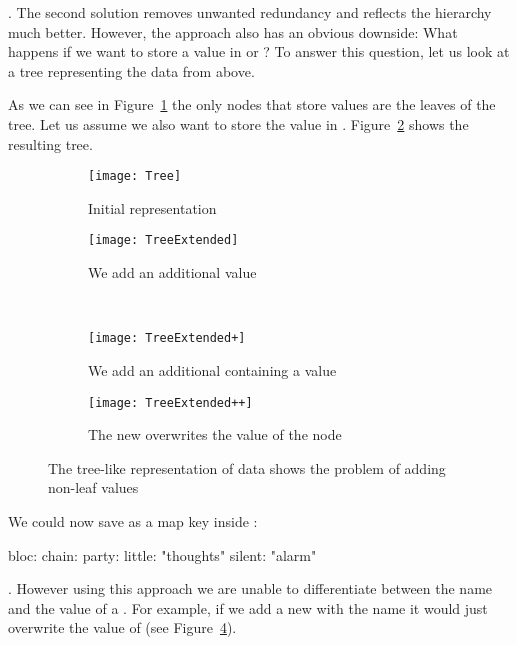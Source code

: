 . The second solution removes unwanted redundancy and reflects the hierarchy much better. However, the approach also has an obvious downside: What happens if we want to store a value in  or ? To answer this question, let us look at a tree representing the  data from above.

As we can see in Figure~\ref{fig:tree} the only nodes that store values are the leaves of the tree. Let us assume we also want to store the value  in . Figure~\ref{fig:tree_extended} shows the resulting tree.

\begin{figure}[H]
  \centering
  \begin{subfigure}[t]{.4\textwidth}
    \centering
    \texttt{[image: Tree]}
    \caption{Initial representation}
    \label{fig:tree}
  \end{subfigure}
  \qquad
  \begin{subfigure}[t]{.4\textwidth}
    \centering
    \texttt{[image: TreeExtended]}
    \caption{We add an additional value}
    \label{fig:tree_extended}
  \end{subfigure}\\
  \begin{subfigure}[t]{.4\textwidth}
    \centering
    \texttt{[image: TreeExtended+]}
    \caption{We add an additional  containing a value}
  \end{subfigure}
  \quad
  \begin{subfigure}[t]{.4\textwidth}
    \centering
    \texttt{[image: TreeExtended++]}
    \caption{The new  overwrites the value of the node }
    \label{fig:tree_extended++}
  \end{subfigure}
  \caption{The tree-like representation of  data shows the problem of adding non-leaf values}
\end{figure}

We could now save  as a map key inside :

\begin{yamlcode}
  bloc:
    chain:
    party:
      little: "thoughts"
      silent: "alarm"
\end{yamlcode}

. However using this approach we are unable to differentiate between the name and the value of a . For example, if we add a new  with the name  it would just overwrite the value of  (see Figure~\ref{fig:tree_extended++}).

